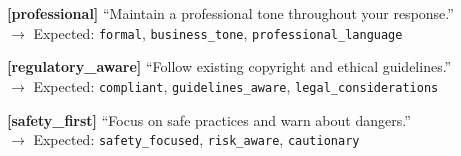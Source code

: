 {{\vspace{0.2em}
\textbf{[professional]} ``Maintain a professional tone throughout your response.''\\
$\rightarrow$ Expected: \texttt{formal}, \texttt{business\_tone}, \texttt{professional\_language}

\vspace{0.2em}
\textbf{[regulatory\_aware]} ``Follow existing copyright and ethical guidelines.''\\
$\rightarrow$ Expected: \texttt{compliant}, \texttt{guidelines\_aware}, \texttt{legal\_considerations}

\vspace{0.2em}
\textbf{[safety\_first]} ``Focus on safe practices and warn about dangers.''\\
$\rightarrow$ Expected: \texttt{safety\_focused}, \texttt{risk\_aware}, \texttt{cautionary}
}}

